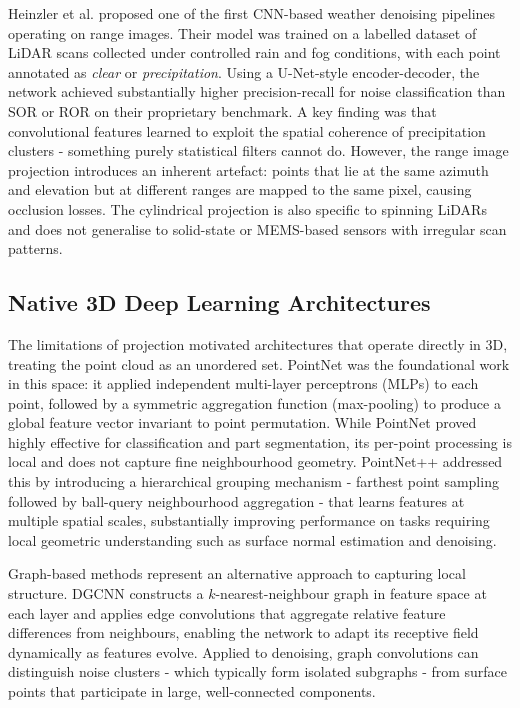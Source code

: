 \documentclass[12pt,a4paper]{article}
\begin{document}
Heinzler et al. \cite{heinzler2020cnn} proposed one of the first CNN-based
weather denoising pipelines operating on range images. Their model was
trained on a labelled dataset of LiDAR scans collected under controlled rain
and fog conditions, with each point annotated as \emph{clear} or
\emph{precipitation}. Using a U-Net-style encoder-decoder, the network
achieved substantially higher precision-recall for noise classification than
SOR or ROR on their proprietary benchmark. A key finding was that
convolutional features learned to exploit the spatial coherence of
precipitation clusters - something purely statistical filters cannot do.
However, the range image projection introduces an inherent artefact: points
that lie at the same azimuth and elevation but at different ranges are mapped
to the same pixel, causing occlusion losses. The cylindrical projection is
also specific to spinning LiDARs and does not generalise to solid-state or
MEMS-based sensors with irregular scan patterns.

\subsection{Native 3D Deep Learning Architectures}

The limitations of projection motivated architectures that operate directly
in 3D, treating the point cloud as an unordered set. PointNet
\cite{qi2017pointnet} was the foundational work in this space: it applied
independent multi-layer perceptrons (MLPs) to each point, followed by a
symmetric aggregation function (max-pooling) to produce a global feature
vector invariant to point permutation. While PointNet proved highly effective
for classification and part segmentation, its per-point processing is local
and does not capture fine neighbourhood geometry. PointNet++
\cite{qi2017pointnetpp} addressed this by introducing a hierarchical grouping
mechanism - farthest point sampling followed by ball-query neighbourhood
aggregation - that learns features at multiple spatial scales, substantially
improving performance on tasks requiring local geometric understanding such
as surface normal estimation and denoising.

Graph-based methods represent an alternative approach to capturing local
structure. DGCNN \cite{wang2019dgcnn} constructs a $k$-nearest-neighbour
graph in feature space at each layer and applies edge convolutions that
aggregate relative feature differences from neighbours, enabling the network
to adapt its receptive field dynamically as features evolve. Applied to
denoising, graph convolutions can distinguish noise clusters - which
typically form isolated subgraphs - from surface points that participate in
large, well-connected components.
\end{document}
